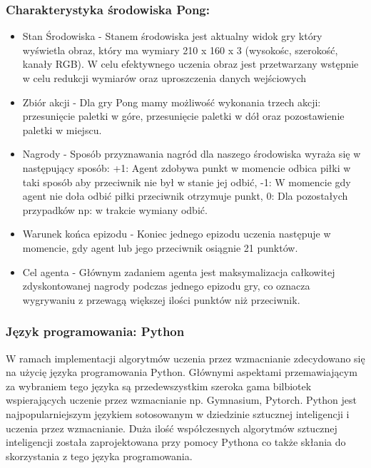 \documentclass[a4paper, 12pt]{article}
\begin{document}
    \subsubsection{Charakterystyka środowiska Pong:} 
    \begin{itemize}
        \item Stan Środowiska - Stanem środowiska jest aktualny widok gry który wyświetla obraz, który ma wymiary 210 x 160 x 3 (wysokośc, szerokość, kanały RGB).
        W celu efektywnego uczenia obraz jest przetwarzany wstępnie w celu redukcji wymiarów oraz uproszczenia danych wejściowych
        \item Zbiór akcji - Dla gry Pong mamy możliwość wykonania trzech akcji: przesunięcie paletki w góre, przesunięcie paletki w dół oraz pozostawienie paletki w miejscu.
        \item Nagrody - Sposób przyznawania nagród dla naszego środowiska wyraża się w następujący sposób: +1: Agent zdobywa punkt w momencie odbica piłki w taki sposób aby przeciwnik nie był w stanie jej odbić,
        -1: W momencie gdy agent nie doła odbić piłki przeciwnik otrzymuje punkt, 0: Dla pozostałych przypadków np: w trakcie wymiany odbić.
        \item Warunek końca epizodu - Koniec jednego epizodu uczenia następuje w momencie, gdy agent lub jego przeciwnik osiągnie 21 punktów.
        \item Cel agenta - Głównym zadaniem agenta jest maksymalizacja całkowitej zdyskontowanej nagrody podczas jednego epizodu gry, co oznacza wygrywaniu z przewagą większej ilości punktów niż przeciwnik.
    \end{itemize}
    \subsubsection{Język programowania: Python}
    W ramach implementacji algorytmów uczenia przez wzmacnianie zdecydowano się na użycię języka programowania Python. Głównymi aspektami przemawiającym za wybraniem tego języka są przedewszystkim szeroka
    gama bilbiotek wspierających uczenie przez wzmacnianie np. Gymnasium, Pytorch. Python jest najpopularniejszym językiem sotosowanym w dziedzinie sztucznej inteligencji i uczenia przez wzmacnianie. Duża ilość 
    współczesnych algorytmów sztucznej inteligencji została zaprojektowana przy pomocy Pythona co także skłania do skorzystania z tego języka programowania. 
\end{document}
